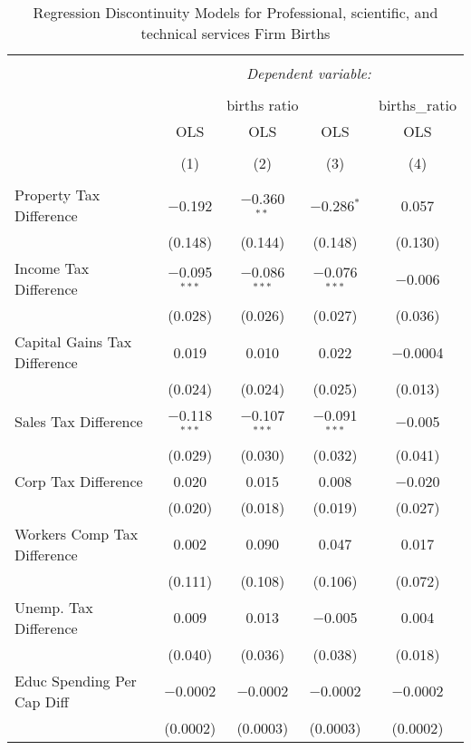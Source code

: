 
\begin{table}[!htbp] \centering 
  \caption{Regression Discontinuity Models for  Professional, scientific, and technical services Firm Births} 
  \label{54rd} 
\begin{tabular}{@{\extracolsep{5pt}}lcccc} 
\\[-1.8ex]\hline 
\hline \\[-1.8ex] 
 & \multicolumn{4}{c}{\textit{Dependent variable:}} \\ 
\cline{2-5} 
\\[-1.8ex] & \multicolumn{3}{c}{births ratio} & births\_ratio \\ 
 & OLS & OLS & OLS & OLS \\ 
\\[-1.8ex] & (1) & (2) & (3) & (4)\\ 
\hline \\[-1.8ex] 
 Property Tax Difference & $-$0.192 & $-$0.360$^{**}$ & $-$0.286$^{*}$ & 0.057 \\ 
  & (0.148) & (0.144) & (0.148) & (0.130) \\ 
  Income Tax Difference & $-$0.095$^{***}$ & $-$0.086$^{***}$ & $-$0.076$^{***}$ & $-$0.006 \\ 
  & (0.028) & (0.026) & (0.027) & (0.036) \\ 
  Capital Gains Tax Difference & 0.019 & 0.010 & 0.022 & $-$0.0004 \\ 
  & (0.024) & (0.024) & (0.025) & (0.013) \\ 
  Sales Tax Difference & $-$0.118$^{***}$ & $-$0.107$^{***}$ & $-$0.091$^{***}$ & $-$0.005 \\ 
  & (0.029) & (0.030) & (0.032) & (0.041) \\ 
  Corp Tax Difference & 0.020 & 0.015 & 0.008 & $-$0.020 \\ 
  & (0.020) & (0.018) & (0.019) & (0.027) \\ 
  Workers Comp Tax Difference & 0.002 & 0.090 & 0.047 & 0.017 \\ 
  & (0.111) & (0.108) & (0.106) & (0.072) \\ 
  Unemp. Tax Difference & 0.009 & 0.013 & $-$0.005 & 0.004 \\ 
  & (0.040) & (0.036) & (0.038) & (0.018) \\ 
  Educ Spending Per Cap Diff & $-$0.0002 & $-$0.0002 & $-$0.0002 & $-$0.0002 \\ 
  & (0.0002) & (0.0003) & (0.0003) & (0.0002) \\ 

\end{tabular}
\end{table}
